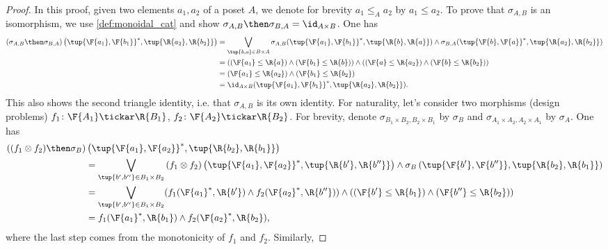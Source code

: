 \begin{proof}
In this proof, given two elements $a_1,a_2$ of a poset $A$, we denote for brevity $a_1 \leq_A a_2$ by $a_1 \leq a_2$.
To prove that $\sigma_{A,B}$ is an isomorphism, we use \cref{def:monoidal_cat} and show $\sigma_{A,B}\then \sigma_{B,A}=\id_{A\times B}$. One has
    \begin{equation}
        \begin{aligned}
           \left( \sigma_{A,B}\then \sigma_{B,A}\right) \left( \tup{\F{a_1},\F{b_1}}^*,\tup{\R{a_2},\R{b_2}}\right)&=\bigvee_{\tup{b,a}\in B\times A}\sigma_{A,B}(\tup{\F{a_1},\F{b_1}}^*,\tup{\R{b},\R{a}})\wedge \sigma_{B,A}(\tup{\F{b},\F{a}}^*,\tup{\R{a_2},\R{b_2}})\\
           &=\left( (\F{a_1}\leq \R{a}) \wedge (\F{b_1}\leq \R{b})\right)\wedge \left((\F{a}\leq \R{a_2}) \wedge (\F{b}\leq \R{b_2})\right)\\
           &=(\F{a_1}\leq \R{a_2})\wedge (\F{b_1}\leq \R{b_2})\\
           &=\id_{A\times B}(\tup{\F{a_1},\F{b_1}}^*,\tup{\R{a_2},\R{b_2}}).
        \end{aligned}
    \end{equation}
    This also shows the second triangle identity, i.e. that $\sigma_{A,B}$ is its own identity.
    For naturality, let's consider two morphisms (design problems) $f_1\colon \F{A_1}\tickar \R{B_1}$, $f_2\colon \F{A_2}\tickar \R{B_2}$. For brevity, denote $\sigma_{B_1\times B_2,B_2\times B_1}$ by $\sigma_B$ and $\sigma_{A_1\times A_2,A_2\times A_1}$ by $\sigma_A$. One has
    \begin{equation}
        \begin{aligned}
           \left((f_1\otimes f_2)\then \sigma_B \right)&\left( \tup{\F{a_1},\F{a_2}}^*,\tup{\R{b_2},\R{b_1}}\right)\\
           &=\bigvee_{\tup{b',b''}\in B_1\times B_2} \left(f_1\otimes f_2\right) \left( \tup{\F{a_1},\F{a_2}}^*,\tup{\R{b'},\R{b''}}\right)\wedge \sigma_B\left(\tup{\F{b'},\F{b''}},\tup{\R{b_2},\R{b_1}} \right)\\
           &=\bigvee_{\tup{b',b''}\in B_1\times B_2}(f_1(\F{a_1}^*,\R{b'})\wedge f_2(\F{a_2}^*,\R{b''}))\wedge (\left(\F{b'}\leq \R{b_1}\right) \wedge \left(\F{b''}\leq \R{b_2}\right))\\
           &= f_1(\F{a_1}^*,\R{b_1}) \wedge f_2(\F{a_2}^*,\R{b_2}),
        \end{aligned}
    \end{equation}
    where the last step comes from the monotonicity of $f_1$ and $f_2$. Similarly,

\end{proof}
